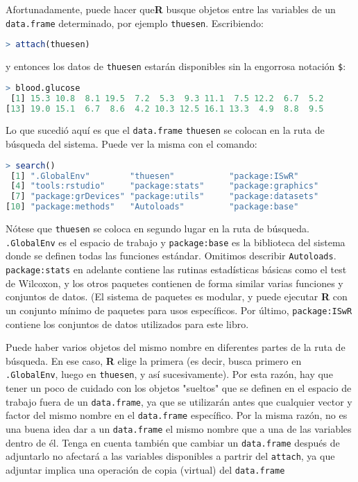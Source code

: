 Afortunadamente, puede hacer que\textbf{R} busque objetos entre las variables
de un \texttt{data.frame} determinado, por ejemplo \texttt{thuesen}. Escribiendo:

\begin{lstlisting}[language=R]
> attach(thuesen)
\end{lstlisting}

y entonces los datos de \texttt{thuesen} estarán disponibles sin la engorrosa
notación \texttt{\$}:

\begin{lstlisting}[language=R]
> blood.glucose
 [1] 15.3 10.8  8.1 19.5  7.2  5.3  9.3 11.1  7.5 12.2  6.7  5.2
[13] 19.0 15.1  6.7  8.6  4.2 10.3 12.5 16.1 13.3  4.9  8.8  9.5
\end{lstlisting}

Lo que sucedió aquí es que el \texttt{data.frame} \texttt{thuesen} se colocan en la
ruta de búsqueda del sistema. Puede ver la misma con el comando:

\begin{lstlisting}[language=R]
> search()
 [1] ".GlobalEnv"        "thuesen"           "package:ISwR"     
 [4] "tools:rstudio"     "package:stats"     "package:graphics" 
 [7] "package:grDevices" "package:utils"     "package:datasets" 
[10] "package:methods"   "Autoloads"         "package:base"     
\end{lstlisting}

Nótese que \texttt{thuesen} se coloca en segundo lugar en la ruta de búsqueda.
\texttt{.GlobalEnv} es el espacio de trabajo y \texttt{package:base} es la
biblioteca del sistema donde se definen todas las funciones estándar. Omitimos
describir \texttt{Autoloads}.  \texttt{package:stats} en adelante contiene las
rutinas estadísticas básicas como el test de Wilcoxon, y los otros paquetes
contienen de forma similar varias funciones y conjuntos de datos. (El sistema
de paquetes es modular, y puede ejecutar \textbf{R} con un conjunto mínimo de
paquetes para usos específicos. Por último, \texttt{package:ISwR} contiene los
conjuntos de datos utilizados para este libro. 


Puede haber varios objetos del mismo nombre en diferentes partes de la ruta de
búsqueda. En ese caso, \textbf{R} elige la primera (es decir, busca primero en
\texttt{.GlobalEnv}, luego en \texttt{thuesen}, y así sucesivamente). Por esta
razón, hay que tener un poco de cuidado con los objetos "sueltos" que se
definen en el espacio de trabajo fuera de un \texttt{data.frame}, ya que se
utilizarán antes que cualquier vector y factor del mismo nombre en el 
\texttt{data.frame} específico. Por la misma razón, no es una buena idea dar a
un \texttt{data.frame} el mismo nombre que a una de las variables dentro de él.
Tenga en cuenta también que cambiar un \texttt{data.frame} después de
adjuntarlo no afectará a las variables disponibles a partrir del
\texttt{attach}, ya que adjuntar implica una operación de copia (virtual) del
\texttt{data.frame} 

